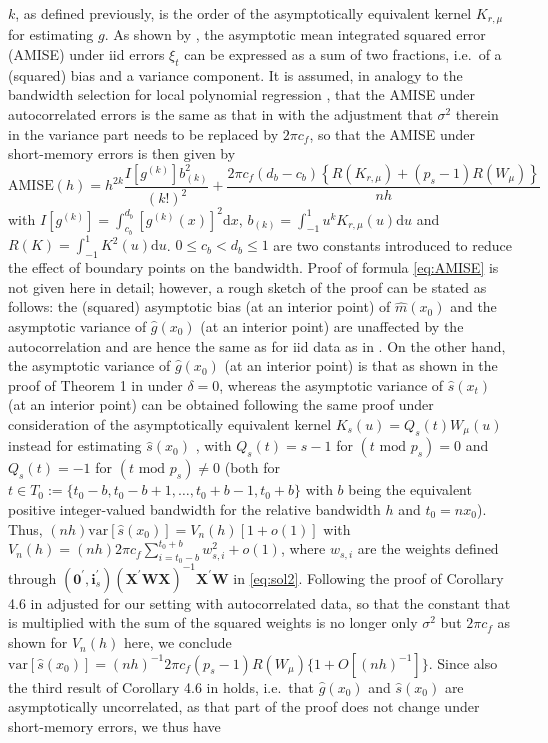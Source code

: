\(k\), as defined previously, is the order of the asymptotically equivalent kernel \(K_{r,\mu}\) for estimating \(g\). As shown by \citet{feng2013seasonal}, the asymptotic mean integrated squared error (AMISE) under iid errors \(\xi_t\) can be expressed as a sum of two fractions, i.e.~of a (squared) bias and a variance component. It is assumed, in analogy to the bandwidth selection for local polynomial regression \citep{BeranFeng2002}, that the AMISE under autocorrelated errors is the same as that in \citet{feng2013seasonal} with the adjustment that \(\sigma^2\) therein in the variance part needs to be replaced by \(2\pi c_f\), so that the AMISE under short-memory errors is then given by
\begin{equation}
\text{AMISE}(h) =  h^{2k}\frac{ I\left[ g^{(k)}  \right] b^2_{(k)}}{(k!)^2} + \frac{2\pi c_f \left(d_b - c_b \right) \left\{ R(K_{r,\mu}) + (p_s - 1)R(W_{\mu}) \right\}}{nh}
\label{eq:AMISE}
\end{equation}
with \(I\left[ g^{(k)} \right]=\int_{c_b}^{d_b} \left[ g^{(k)}(x) \right]^2\text{d}x\), \(b_{(k)} = \int_{-1}^{1} u^k K_{r,\mu}(u) \text{d}u\) and \(R(K) = \int_{-1}^{1} K^2 (u)\text{d}u\). \(0 \leq c_b < d_b \leq 1\) are two constants introduced to reduce the effect of boundary points on the bandwidth. Proof of formula \eqref{eq:AMISE} is not given here in detail; however, a rough sketch of the proof can be stated as follows: the (squared) asymptotic bias (at an interior point) of \(\hat m(x_0)\) and the asymptotic variance of \(\hat g(x_0)\) (at an interior point) are unaffected by the autocorrelation and are hence the same as for iid data as in \citet{feng2013seasonal}. On the other hand, the asymptotic variance of \(\hat g(x_0)\) (at an interior point) is that as shown in the proof of Theorem 1 in \citet{BeranFeng2002} under \(\delta = 0\), whereas the asymptotic variance of \(\hat s (x_t)\) (at an interior point) can be obtained following the same proof under consideration of the asymptotically equivalent kernel \(K_s(u) = Q_s(t)W_\mu(u)\) instead for estimating \(\hat s(x_0)\) \citep[see Equation (4.21) in][]{feng1999kernel}, with \(Q_s(t)=s-1\) for \((t \text{ mod } p_s) = 0\) and \(Q_s(t) = -1\) for \((t \text{ mod } p_s) \neq 0\) (both for \(t\in T_0:=\{t_0-b, t_0-b+1,\dots,t_0+b-1,t_0+b\}\) with \(b\) being the equivalent positive integer-valued bandwidth for the relative bandwidth \(h\) and \(t_0=nx_0\)). Thus, \((nh)\text{var}[\hat s (x_0)]=V_n(h)[1+o(1)]\) with \(V_n(h) = (nh)2\pi c_f \sum_{i=t_0-b}^{t_0+b}w_{s,i}^2 + o(1)\), where \(w_{s,i}\) are the weights defined through \(\left(\mathbf{0}^{'},\mathbf{i}_{s}^{'}\right)\left(\mathbf{X}^{'}\mathbf{W}\mathbf{X}\right)^{-1}\mathbf{X}^{'}\mathbf{W}\) in \eqref{eq:sol2}. Following the proof of Corollary 4.6 in \citet{feng1999kernel} adjusted for our setting with autocorrelated data, so that the constant that is multiplied with the sum of the squared weights is no longer only \(\sigma^2\) but \(2\pi c_f\) as shown for \(V_n(h)\) here, we conclude \(\text{var}[\hat s(x_0)]=(nh)^{-1}2\pi c_f (p_s-1)R(W_\mu)\{1+O[(nh)^{-1}]\}\). Since also the third result of Corollary 4.6 in \citet{feng1999kernel} holds, i.e.~that \(\hat g(x_0)\) and \(\hat s (x_0)\) are asymptotically uncorrelated, as that part of the proof does not change under short-memory errors, we thus have
